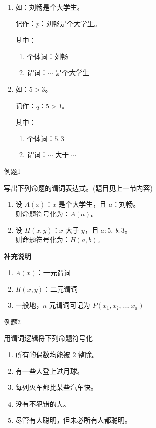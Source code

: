 \begin{enumerate}

\item 如：刘畅是个大学生。

记作：\(p\)：刘畅是个大学生。

其中：
\begin{enumerate}
	\item 个体词：刘畅
	\item 谓词：\(\cdots\) 是个大学生
\end{enumerate}

\item 如：\(5>3\)。

记作：\(q\)：\(5>3\)。

其中：
\begin{enumerate}
	\item 个体词：\(5,3\)
	\item 谓词：\(\cdots\) 大于 \(\cdots\)
\end{enumerate}

\end{enumerate}


\begin{question}{例题1}

写出下列命题的谓词表达式。(题目见上一节内容)

\begin{enumerate}
	\item 设 \(A(x)\)：\(x\) 是个大学生，且 \(a\)：刘畅。\\
	则命题符号化为：\(A(a)\)。
	
	\item 设 \(H(x,y)\)：\(x\) 大于 \(y\)，且 \(a:5,\ b:3\)。\\
	则命题符号化为：\(H(a,b)\)。
\end{enumerate}

\textbf{补充说明}
\begin{enumerate}
	\item \(A(x)\)：一元谓词
	\item \(H(x,y)\)：二元谓词
	\item 一般地，\(n\) 元谓词可记为 \(P(x_1,x_2,\dots,x_n)\)
\end{enumerate}



\end{question}


\begin{question}{例题2}

用谓词逻辑将下列命题符号化

\begin{enumerate}
	\item 所有的偶数均能被 \(2\) 整除。
	\item 有一些人登上过月球。
	\item 每列火车都比某些汽车快。
	\item 没有不犯错的人。
	\item 尽管有人聪明，但未必所有人都聪明。
\end{enumerate}

\end{question}

